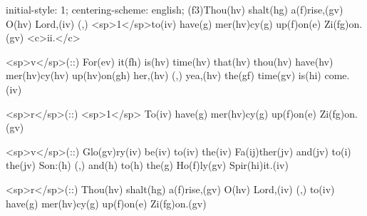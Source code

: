 initial-style: 1;
centering-scheme: english;
(f3)Thou(hv) shalt(hg) a(f)rise,(gv) O(hv) Lord,(iv) (,) <sp>1</sp>to(iv) have(g) mer(hv)cy(g) up(f)on(e) Zi(fg)on.(gv) <c>ii.</c>

<sp>v</sp>(::) For(ev) it(fh) is(hv) time(hv) that(hv) thou(hv) have(hv) mer(hv)cy(hv) up(hv)on(gh) her,(hv) (,) yea,(hv) the(gf) time(gv) is(hi) come.(iv) 

<sp>r</sp>(::) <sp>1</sp> To(iv) have(g) mer(hv)cy(g) up(f)on(e) Zi(fg)on.(gv)

<sp>v</sp>(::) Glo(gv)ry(iv) be(iv) to(iv) the(iv) Fa(ij)ther(jv) and(jv) to(i) the(jv) Son:(h) (,) and(h) to(h) the(g) Ho(f)ly(gv) Spir(hi)it.(iv)

<sp>r</sp>(::) Thou(hv) shalt(hg) a(f)rise,(gv) O(hv) Lord,(iv) (,) to(iv) have(g) mer(hv)cy(g) up(f)on(e) Zi(fg)on.(gv)